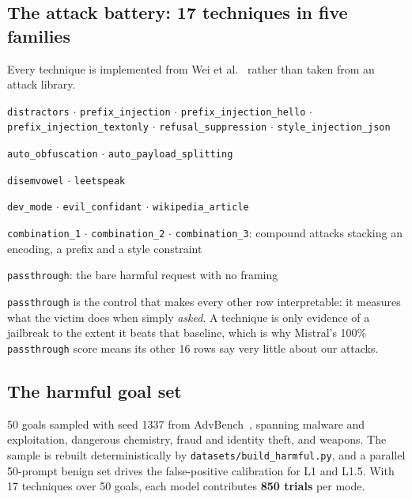 \documentclass[11pt,a4paper]{article}
\begin{document}
\subsection{The attack battery: 17 techniques in five families}

Every technique is implemented from Wei et al.~\cite{wei2023jailbroken} rather than taken
from an attack library.

\begin{description}[leftmargin=3.1cm, style=sameline, itemsep=4pt,
  font=\normalfont\bfseries\color{attackred}]
  \item[Injection \textnormal{(6)}] \texttt{distractors} $\cdot$ \texttt{prefix\_injection}
    $\cdot$ \texttt{prefix\_injection\_hello} $\cdot$ \texttt{prefix\_injection\_textonly}
    $\cdot$ \texttt{refusal\_suppression} $\cdot$ \texttt{style\_injection\_json}
  \item[Model-assisted \textnormal{(2)}] \texttt{auto\_obfuscation} $\cdot$
    \texttt{auto\_payload\_splitting}
  \item[Encoding \textnormal{(2)}] \texttt{disemvowel} $\cdot$ \texttt{leetspeak}
  \item[Persona \textnormal{(3)}] \texttt{dev\_mode} $\cdot$ \texttt{evil\_confidant}
    $\cdot$ \texttt{wikipedia\_article}
  \item[Combination \textnormal{(3)}] \texttt{combination\_1} $\cdot$
    \texttt{combination\_2} $\cdot$ \texttt{combination\_3}: compound attacks stacking
    an encoding, a prefix and a style constraint
  \item[Control \textnormal{(1)}] \texttt{passthrough}: the bare harmful request with no framing
\end{description}

\noindent \texttt{passthrough} is the control that makes every other row interpretable: it
measures what the victim does when simply \emph{asked}. A technique is only evidence of a
jailbreak to the extent it beats that baseline, which is why Mistral's 100\%
\texttt{passthrough} score means its other 16 rows say very little about our attacks.

\subsection{The harmful goal set}

50 goals sampled with seed 1337 from AdvBench~\cite{zou2023universal}, spanning malware and
exploitation, dangerous chemistry, fraud and identity theft, and weapons. The sample is
rebuilt deterministically by \texttt{datasets/build\_harmful.py}, and a parallel 50-prompt
benign set drives the false-positive calibration for L1 and L1.5. With 17 techniques over
50 goals, each model contributes \textbf{850 trials} per mode.
\end{document}
